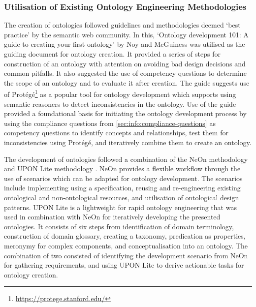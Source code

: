 \subsubsection*{Utilisation of Existing Ontology Engineering Methodologies}
The creation of ontologies followed guidelines and methodologies deemed `best practice' by the semantic web community. In this, `Ontology development 101: A guide to creating your first ontology' by Noy and McGuiness \cite{noy_ontology_2001} was utilised as the guiding document for ontology creation. It provided a series of steps for construction of an ontology with attention on avoiding bad design decisions and common pitfalls. It also suggested the use of competency questions to determine the scope of an ontology and to evaluate it after creation. 
The guide suggests use of Protégé\footnote{\url{https://protege.stanford.edu/}} as a popular tool for ontology development which supports using semantic reasoners to detect inconsistencies in the ontology.
Use of the guide provided a foundational basis for initiating the ontology development process by using the compliance questions from \autoref{sec:info:compliance-questions} as competency questions to identify concepts and relationships, test them for inconsistencies using Protégé, and iteratively combine them to create an ontology. 

The development of ontologies followed a combination of the NeOn methodology \cite{} and UPON Lite methodology \cite{}. NeOn provides a flexible workflow through the use of scenarios which can be adapted for ontology development. The scenarios include implementing using a specification, reusing and re-engineering existing ontological and non-ontological resources, and utilisation of ontological design patterns. 
UPON Lite \cite{} is a lightweight for rapid ontology engineering that was used in combination with NeOn for iteratively developing the presented ontologies. It consists of six steps from identification of domain terminology, construction of domain glossary, creating a taxonomy, predication as properties, meronymy for complex components, and conceptualisation into an ontology.
The combination of two consisted of identifying the development scenario from NeOn for gathering requirements, and using UPON Lite to derive actionable tasks for ontology creation.

